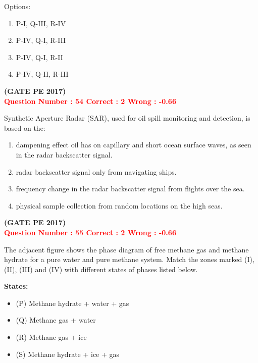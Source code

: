 \documentclass[12pt]{article}
\begin{document}
{\vspace{1em}

Options:
\begin{enumerate}[label=(\Alph*)]
    \item P-I, Q-III, R-IV  
    \item P-IV, Q-I, R-III  
    \item P-IV, Q-I, R-II  
    \item P-IV, Q-II, R-III  
\end{enumerate}
\hfill\textbf{(GATE PE 2017)}\\[0.6cm]

\textcolor{red}{\textbf{Question Number : 54 \hfill Correct : 2  Wrong : -0.66}}


Synthetic Aperture Radar (SAR), used for oil spill monitoring and detection, is based on the:\\

\begin{enumerate}[label=(\Alph*)]
    \item dampening effect oil has on capillary and short ocean surface waves, as seen in the radar backscatter signal.
    \item radar backscatter signal only from navigating ships.
    \item frequency change in the radar backscatter signal from flights over the sea.
    \item physical sample collection from random locations on the high seas.
\end{enumerate}

\hfill\textbf{(GATE PE 2017)}\\[0.6cm]


\textcolor{red}{\textbf{Question Number : 55 \hfill Correct : 2  Wrong : -0.66}}


\begin{minipage}{0.58\textwidth}
The adjacent figure shows the phase diagram of free methane gas and methane hydrate for a pure water and pure methane system. Match the zones marked (I), (II), (III) and (IV) with different states of phases listed below.


\textbf{States:}
\begin{itemize}[leftmargin=*]
  \item (P) Methane hydrate + water + gas  
  \item (Q) Methane gas + water  
  \item (R) Methane gas + ice  
  \item (S) Methane hydrate + ice + gas  
\end{itemize}



\end{minipage}}
\end{document}
